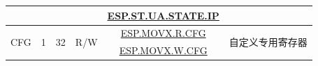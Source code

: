 \begin{ThreePartTable}
\begin{longtable}[c]{|l|c|c|c|c|l|}
    & & & & \hyperref[instruction:ESPSTUA_STATEIP]{ESP.ST.UA.STATE.IP} & \\\hline

\multirow{2}{*}{CFG} & \multirow{2}{*}{1} & \multirow{2}{*}{32} & \multirow{2}{*}{R/W} & \hyperref[instruction:ESPMOVXRCFG]{ESP.MOVX.R.CFG}  & \multirow{2}{*}{自定义专用寄存器} \\\cline{5-5}

  & & & & \hyperref[instruction:ESPMOVXWCFG]{ESP.MOVX.W.CFG}  & \\\hline

\end{longtable}

\end{ThreePartTable}
